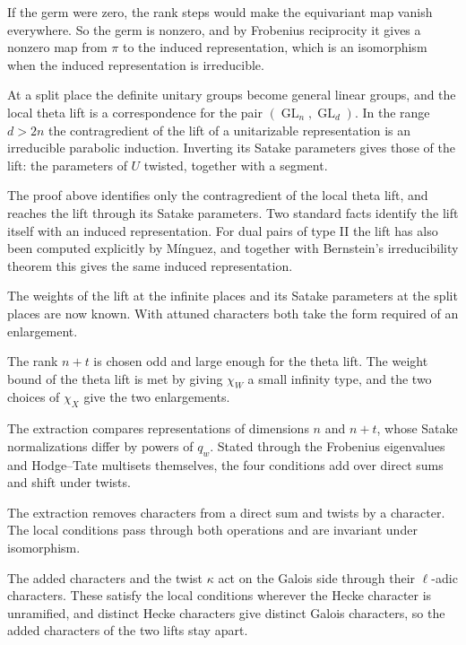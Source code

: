 If the germ were zero, the rank steps would make the equivariant map vanish everywhere. So the germ is
nonzero, and by Frobenius reciprocity it gives a nonzero map from $\pi$ to the induced representation, which
is an isomorphism when the induced representation is irreducible.

At a split place the definite unitary groups become general linear groups, and the local theta lift is
a correspondence for the pair $(\operatorname{GL}_n,\operatorname{GL}_d)$. In the range $d>2n$ the
contragredient of the lift of a unitarizable representation is an irreducible parabolic induction.
Inverting its Satake parameters gives those of the lift: the parameters of $U$ twisted, together with a
segment.

The proof above identifies only the contragredient of the local theta lift, and reaches the lift through
its Satake parameters. Two standard facts identify the lift itself with an induced representation. For
dual pairs of type II the lift has also been computed explicitly by Mínguez, and together with Bernstein's
irreducibility theorem this gives the same induced representation.

The weights of the lift at the infinite places and its Satake parameters at the split places are now
known. With attuned characters both take the form required of an enlargement.

The rank $n+t$ is chosen odd and large enough for the theta lift. The weight bound of the theta lift is
met by giving $\chi_W$ a small infinity type, and the two choices of $\chi_X$ give the two enlargements.

The extraction compares representations of dimensions $n$ and $n+t$, whose Satake normalizations
differ by powers of $q_w$. Stated through the Frobenius eigenvalues and Hodge--Tate multisets themselves,
the four conditions add over direct sums and shift under twists.

The extraction removes characters from a direct sum and twists by a character. The local conditions
pass through both operations and are invariant under isomorphism.

The added characters and the twist $\kappa$ act on the Galois side through their $\ell$-adic characters.
These satisfy the local conditions wherever the Hecke character is unramified, and distinct Hecke
characters give distinct Galois characters, so the added characters of the two lifts stay apart.


